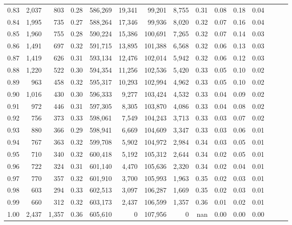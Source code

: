 \begin{tabular}{rrrrrrrrrrrrrrr}
0.83 &   2,037 &    803 &  0.28 &  586,269 &   19,341 &   99,201 &    8,755 &  0.31 &  0.08 &  0.18 &      0.04 \\
0.84 &   1,995 &    735 &  0.27 &  588,264 &   17,346 &   99,936 &    8,020 &  0.32 &  0.07 &  0.16 &      0.04 \\
0.85 &   1,960 &    755 &  0.28 &  590,224 &   15,386 &  100,691 &    7,265 &  0.32 &  0.07 &  0.14 &      0.03 \\
0.86 &   1,491 &    697 &  0.32 &  591,715 &   13,895 &  101,388 &    6,568 &  0.32 &  0.06 &  0.13 &      0.03 \\
0.87 &   1,419 &    626 &  0.31 &  593,134 &   12,476 &  102,014 &    5,942 &  0.32 &  0.06 &  0.12 &      0.03 \\
0.88 &   1,220 &    522 &  0.30 &  594,354 &   11,256 &  102,536 &    5,420 &  0.33 &  0.05 &  0.10 &      0.02 \\
0.89 &     963 &    458 &  0.32 &  595,317 &   10,293 &  102,994 &    4,962 &  0.33 &  0.05 &  0.10 &      0.02 \\
0.90 &   1,016 &    430 &  0.30 &  596,333 &    9,277 &  103,424 &    4,532 &  0.33 &  0.04 &  0.09 &      0.02 \\
0.91 &     972 &    446 &  0.31 &  597,305 &    8,305 &  103,870 &    4,086 &  0.33 &  0.04 &  0.08 &      0.02 \\
0.92 &     756 &    373 &  0.33 &  598,061 &    7,549 &  104,243 &    3,713 &  0.33 &  0.03 &  0.07 &      0.02 \\
0.93 &     880 &    366 &  0.29 &  598,941 &    6,669 &  104,609 &    3,347 &  0.33 &  0.03 &  0.06 &      0.01 \\
0.94 &     767 &    363 &  0.32 &  599,708 &    5,902 &  104,972 &    2,984 &  0.34 &  0.03 &  0.05 &      0.01 \\
0.95 &     710 &    340 &  0.32 &  600,418 &    5,192 &  105,312 &    2,644 &  0.34 &  0.02 &  0.05 &      0.01 \\
0.96 &     722 &    324 &  0.31 &  601,140 &    4,470 &  105,636 &    2,320 &  0.34 &  0.02 &  0.04 &      0.01 \\
0.97 &     770 &    357 &  0.32 &  601,910 &    3,700 &  105,993 &    1,963 &  0.35 &  0.02 &  0.03 &      0.01 \\
0.98 &     603 &    294 &  0.33 &  602,513 &    3,097 &  106,287 &    1,669 &  0.35 &  0.02 &  0.03 &      0.01 \\
0.99 &     660 &    312 &  0.32 &  603,173 &    2,437 &  106,599 &    1,357 &  0.36 &  0.01 &  0.02 &      0.01 \\
1.00 &   2,437 &  1,357 &  0.36 &  605,610 &        0 &  107,956 &        0 &   nan &  0.00 &  0.00 &      0.00 \\
\bottomrule
\end{tabular}
